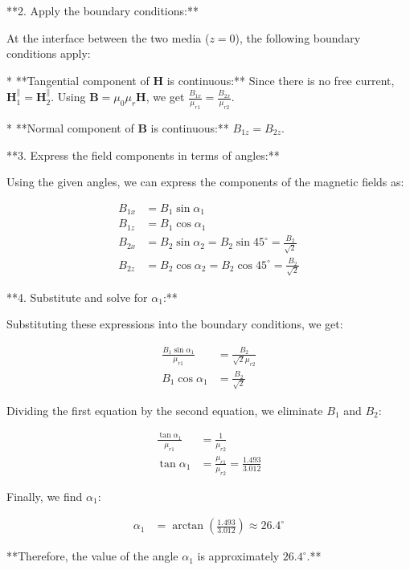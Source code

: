\documentclass{article}
\begin{document}
**2. Apply the boundary conditions:**

At the interface between the two media ($z=0$), the following boundary conditions apply:

* **Tangential component of $\mathbf{H}$ is continuous:** 
   Since there is no free current, $\mathbf{H}_1^\parallel = \mathbf{H}_2^\parallel$.  
   Using $\mathbf{B} = \mu_0 \mu_r \mathbf{H}$, we get $\frac{B_{1x}}{\mu_{r1}} = \frac{B_{2x}}{\mu_{r2}}$.

* **Normal component of $\mathbf{B}$ is continuous:**
   $B_{1z} = B_{2z}$.

**3. Express the field components in terms of angles:**

Using the given angles, we can express the components of the magnetic fields as:

\begin{align*}
B_{1x} &= B_1 \sin{\alpha_1} \\
B_{1z} &= B_1 \cos{\alpha_1} \\
B_{2x} &= B_2 \sin{\alpha_2} = B_2 \sin{45^\circ} = \frac{B_2}{\sqrt{2}}\\
B_{2z} &= B_2 \cos{\alpha_2} = B_2 \cos{45^\circ} = \frac{B_2}{\sqrt{2}}
\end{align*}

**4. Substitute and solve for $\alpha_1$:**

Substituting these expressions into the boundary conditions, we get:

\begin{align*}
\frac{B_1 \sin{\alpha_1}}{\mu_{r1}} &= \frac{B_2}{\sqrt{2} \mu_{r2}} \\
B_1 \cos{\alpha_1} &= \frac{B_2}{\sqrt{2}}
\end{align*}

Dividing the first equation by the second equation, we eliminate $B_1$ and $B_2$:

\begin{align*}
\frac{\tan{\alpha_1}}{\mu_{r1}} &= \frac{1}{\mu_{r2}} \\
\tan{\alpha_1} &= \frac{\mu_{r1}}{\mu_{r2}} = \frac{1.493}{3.012} 
\end{align*}

Finally, we find $\alpha_1$:

\begin{align*}
\alpha_1 &= \arctan{\left(\frac{1.493}{3.012}\right)} \approx 26.4^\circ 
\end{align*}

**Therefore, the value of the angle $\alpha_1$ is approximately $26.4^\circ$.**
\end{document}
